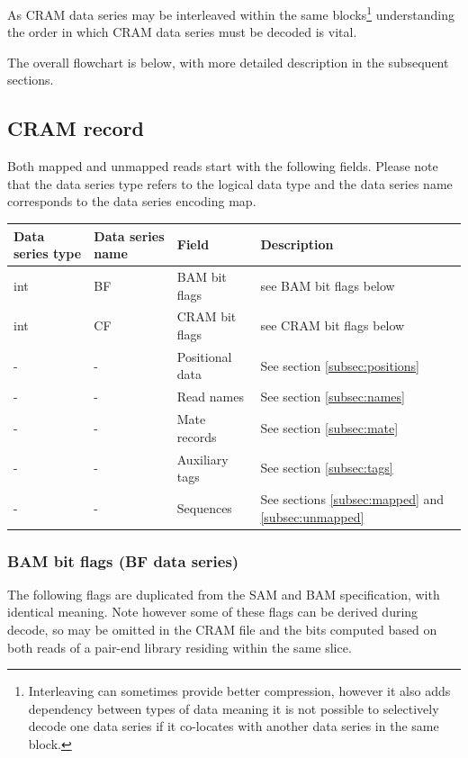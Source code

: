 \documentclass[a4paper]{article}
\begin{document}
As CRAM data series may be interleaved within the same blocks\footnote{Interleaving can sometimes provide better compression, however it also adds dependency between types of data meaning it is not possible to selectively decode one data series if it co-locates with another data series in the same block.} understanding the order in which CRAM data series must be decoded is vital.

The overall flowchart is below, with more detailed description in the subsequent sections.

\algnewcommand{}

\subsection{\textbf{CRAM record}}

Both mapped and unmapped reads start with the following fields. Please note that 
the data series type refers to the logical data type and the data series name corresponds 
to the data series encoding map.

\begin{tabular}{|>{\raggedright}p{70pt}|>{\raggedright}p{75pt}|>{\raggedright}p{90pt}|>{\raggedright}p{171pt}|}
\hline
\textbf{Data series type} & \textbf{Data series name} & \textbf{Field} & \textbf{Description}\tabularnewline
\hline
int & BF & BAM bit flags & see BAM bit flags below\tabularnewline
\hline
int & CF & CRAM bit flags & see CRAM bit flags below\tabularnewline
\hline
- & - & Positional data & See section \ref{subsec:positions}\tabularnewline
\hline
- & - & Read names & See section \ref{subsec:names}\tabularnewline
\hline
- & - & Mate records & See section \ref{subsec:mate}\tabularnewline
\hline
- & - & Auxiliary tags & See section \ref{subsec:tags}\tabularnewline
\hline
- & - & Sequences & See sections \ref{subsec:mapped} and \ref{subsec:unmapped}\tabularnewline
\hline
\end{tabular}

\subsubsection*{\textbf{BAM bit flags (BF data series)}}

The following flags are duplicated from the SAM and BAM specification, with identical meaning.
Note however some of these flags can be derived during decode, so may be omitted in the CRAM file and the bits computed based on both reads of a pair-end library residing within the same slice.
\end{document}
